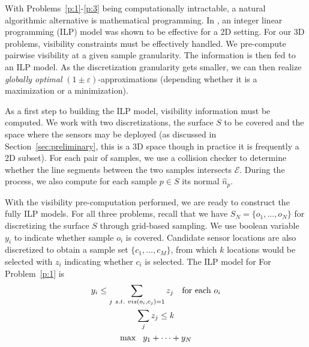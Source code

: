 With Problems~\ref{p:1}-\ref{p:3} being computationally intractable, a natural algorithmic alternative is mathematical programming. In \cite{FenYuRSS20}, an integer linear programming (ILP) model was shown to be effective for a 2D setting. For our 3D problems, visibility constraints must be effectively handled. We pre-compute pairwise visibility at a given sample granularity. The information is then fed to an ILP model. As the discretization granularity gets smaller, we can then realize \emph{globally optimal} $(1\pm \varepsilon)$-approximations (depending whether it is a maximization or a minimization). 

As a first step to building the ILP model, visibility information must be computed. 
We work with two discretizations, the surface $S$ to be covered and the space where the sensors may be deployed (as discussed in Section~\ref{sec:preliminary}, this is a 3D space though in practice it is frequently a 2D subset). For each pair of samples, we use a collision checker \cite{cgal:aabb-20b} to determine whether the line segments between the two samples intersects $\mathcal E$. During the process, we also compute for each sample $p\in S$ its normal $\hat{n}_p$.


%
With the visibility pre-computation performed, we are ready to construct the fully ILP models. For all three problems, recall that we have $S_N = \{o_1, \ldots, o_N\}$ for discretizing the surface $S$ through grid-based sampling. 
We use boolean variable $y_i$ to indicate whether sample $o_i$ is covered. 
Candidate sensor locations are also discretized to obtain a sample set $\{c_1, \ldots, c_M\}$, from which $k$ locations would be selected with $z_i$ indicating whether $c_i$ is selected. The ILP model for For Problem~\ref{p:1} is
\begin{gather}
    y_i   \leq \sum_{j\ s.t.\ vis(o_i, c_j) = 1} z_j   \text{\quad for each } o_i\\
    \sum_j z_j \leq k\\
    \max\ \ y_1 + \dots + y_N
\end{gather}


